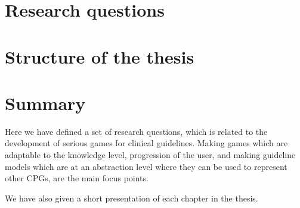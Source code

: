 

\section{Research questions}

\section{Structure of the thesis}
\section{Summary}
Here we have defined a set of research questions, which is related to the development of serious games for clinical guidelines. Making games which are adaptable to the knowledge level, progression of the user, and making guideline models which are at an abstraction level where they can be used to represent other CPGs, are the main focus points.

We have also given a short presentation of each chapter in the thesis.

